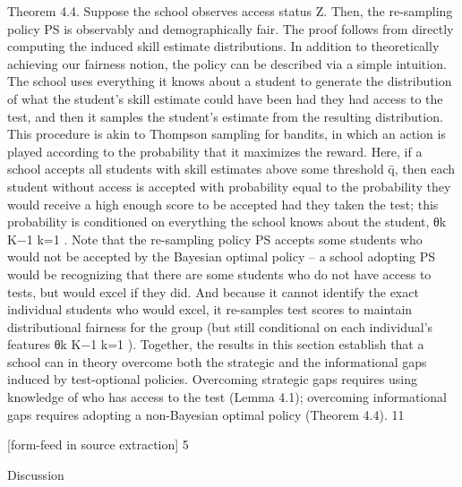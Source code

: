 \documentclass[10pt]{article}
\begin{document}
\begin{ReviewVerbatim}
Theorem 4.4. Suppose the school observes access status Z. Then, the re-sampling policy PS is
observably and demographically fair.
The proof follows from directly computing the induced skill estimate distributions. In addition
to theoretically achieving our fairness notion, the policy can be described via a simple intuition. The
school uses everything it knows about a student to generate the distribution of what the student’s
skill estimate could have been had they had access to the test, and then it samples the student’s
estimate from the resulting distribution.
This procedure is akin to Thompson sampling for bandits, in which an action is played according
to the probability that it maximizes the reward. Here, if a school accepts all students with skill
estimates above some threshold q̄, then each student without access is accepted with probability
equal to the probability they would receive a high enough score to be accepted had they taken the
test; this probability is conditioned on everything the school knows about the student, {θk }K−1
k=1 .
Note that the re-sampling policy PS accepts some students who would not be accepted by the
Bayesian optimal policy – a school adopting PS would be recognizing that there are some students
who do not have access to tests, but would excel if they did. And because it cannot identify the exact
individual students who would excel, it re-samples test scores to maintain distributional fairness for
the group (but still conditional on each individual’s features {θk }K−1
k=1 ).
Together, the results in this section establish that a school can in theory overcome both the
strategic and the informational gaps induced by test-optional policies. Overcoming strategic gaps
requires using knowledge of who has access to the test (Lemma 4.1); overcoming informational gaps
requires adopting a non-Bayesian optimal policy (Theorem 4.4).
11


[form-feed in source extraction]
5

Discussion


\end{ReviewVerbatim}
\end{document}
